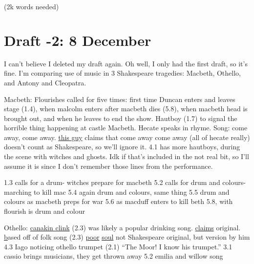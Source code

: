 \documentclass[12pt]{article}[titlepage]
\newcommand{\say}[1]{``#1''}
\newcommand{\1}{\={a}}
\newcommand{\2}{\={e}}
\newcommand{\3}{\={\i}}
\newcommand{\4}{\=o}
\newcommand{\5}{\=u}
\newcommand{\6}{\={A}}
\renewcommand{\,}{\textsuperscript{,}}
\begin{document}
(2k words needed)
\section{Draft -2: 8 December}
I can't believe I deleted my draft again.
Oh well, I only had the first draft, so it's fine.
I'm comparing use of music in 3 Shakespeare tragedies: Macbeth, Othello, and Antony and Cleopatra.

Macbeth:
Flourishes called for five times: first time Duncan enters and leaves stage (1.4), when malcolm enters after macbeth dies (5.8), when macbeth head is brought out, and when he leaves to end the show.
Hautboy (1.7) to signal the horrible thing happening at castle Macbeth.
Hecate speaks in rhyme.
Song: come away, come away.
\href{https://doi.org/10.1093/mq/XLVII.1.22}{this guy} claims that come away come away (all of hecate really) doesn't count as Shakespeare, so we'll ignore it.
4.1 has more hautboys, during the scene with witches and ghosts.
Idk if that's included in the not real bit, so I'll assume it is since I don't remember those lines from the performance.

1.3 calls for a drum- witches prepare for macbeth
5.2 calls for drum and colours- marching to kill mac
5.4 again drum and colours, same thing
5.5 drum and colours as macbeth preps for war
5.6 as macduff enters to kill beth
5.8, with flourish is drum and colour

Othello:
\href{https://www.shakespeare.org.uk/explore-shakespeare/blogs/shakespeares-drinking-songs/}{canakin clink} (2.3) was likely a popular drinking song. \href{http://www.lieder.net/lieder/get_text.html?TextId=18061}{claims} original.
\href{http://www.lieder.net/lieder/get_text.html?TextId=31027} based off of folk song (2.3)
\href{http://www.lieder.net/lieder/get_text.html?TextId=14898}{poor} \href{https://www.shakespeare.org.uk/explore-shakespeare/blogs/shakespeares-saddest-song/}{soul} not Shakespeare original, but version by him 4.3
Iago noticing othello trumpet (2.1) \say{The Moor! I know his trumpet.}
3.1 cassio brings musicians, they get thrown away
5.2 emilia and willow song
\end{document}
